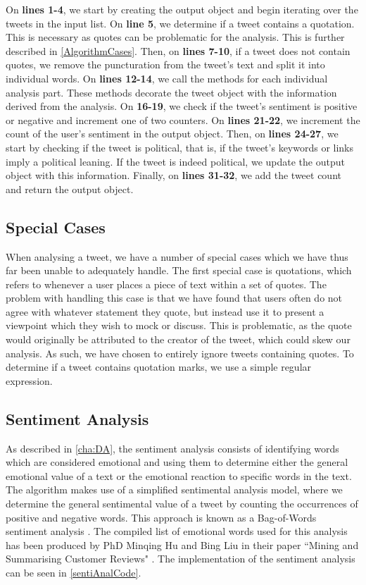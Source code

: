 On \textbf{lines 1-4}, we start by creating the output object and begin
iterating over the tweets in the input list. On \textbf{line 5}, we determine if
a tweet contains a quotation. This is necessary as quotes can be problematic for
the analysis. This is further described in \autoref{AlgorithmCases}. Then, on
\textbf{lines 7-10}, if a tweet does not contain quotes, we remove the
puncturation from the tweet's text and split it into individual words. On
\textbf{lines 12-14}, we call the methods for each individual analysis part.
These methods decorate the tweet object with the information derived from the
analysis. On \textbf{16-19}, we check if the tweet's sentiment is positive or
negative and increment one of two counters. On \textbf{lines 21-22}, we
increment the count of the user's sentiment in the output object. Then, on
\textbf{lines 24-27}, we start by checking if the tweet is political, that is,
if the tweet's keywords or links imply a political leaning.
If the tweet is indeed political, we update the output object with this
information. Finally, on \textbf{lines 31-32}, we add the tweet count and return
the output object.

\subsection{Special Cases}\label{AlgorithmCases}
When analysing a tweet, we have a number of special cases which we have thus far
been unable to adequately handle. The first special case is quotations, which
refers to whenever a user places a piece of text within a set of quotes. The
problem with handling this case is that we have found that users often do not
agree with whatever statement they quote, but instead use it to present a
viewpoint which they wish to mock or discuss. This is problematic, as the quote
would originally be attributed to the creator of the tweet, which could skew our
analysis. As such, we have chosen to entirely ignore tweets containing quotes.
To determine if a tweet contains quotation marks, we use a simple regular
expression.

\subsection{Sentiment Analysis}
As described in \autoref{cha:DA}, the sentiment analysis consists of
identifying words which are considered emotional and using them to determine
either the general emotional value of a text or the emotional reaction to
specific words in the text. The algorithm makes use of a simplified sentimental
analysis model, where we determine the general sentimental value of a tweet by
counting the occurrences of positive and negative words. This approach is known
as a Bag-of-Words sentiment analysis \citep{BagOfWords}. The compiled list of
emotional words used for this analysis has been produced by PhD Minqing Hu and
Bing Liu in their paper ``Mining and Summarising Customer Reviews"
\citep{Hu:2004:MSC:1014052.1014073}. The implementation of the sentiment
analysis can be seen in \autoref{sentiAnalCode}.\\

